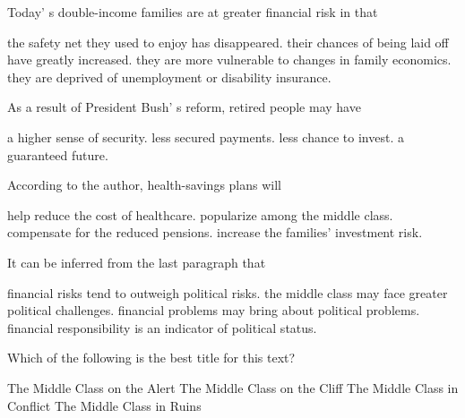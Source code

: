 \item Today' s double-income families are at greater financial risk in that
\begin{tasks}
	\task the safety net they used to enjoy has disappeared.
	\task their chances of being laid off have greatly increased.
	\task they are more vulnerable to changes in family economics.
	\task they are deprived of unemployment or disability insurance.
\end{tasks}
\item As a result of President Bush' s reform, retired people may have
\begin{tasks}
	\task a higher sense of security.
	\task less secured payments.
	\task less chance to invest.
	\task a guaranteed future.
\end{tasks}
\item According to the author, health-savings plans will
\begin{tasks}
	\task help reduce the cost of healthcare.
	\task popularize among the middle class.
	\task compensate for the reduced pensions.
	\task increase the families' investment risk.
\end{tasks}
\item It can be inferred from the last paragraph that
\begin{tasks}
	\task financial risks tend to outweigh political risks.
	\task the middle class may face greater political challenges.
	\task financial problems may bring about political problems.
	\task financial responsibility is an indicator of political status.
\end{tasks}
\item Which of the following is the best title for this text?
\begin{tasks}
	\task The Middle Class on the Alert
	\task The Middle Class on the Cliff
	\task The Middle Class in Conflict
	\task The Middle Class in Ruins
\end{tasks}